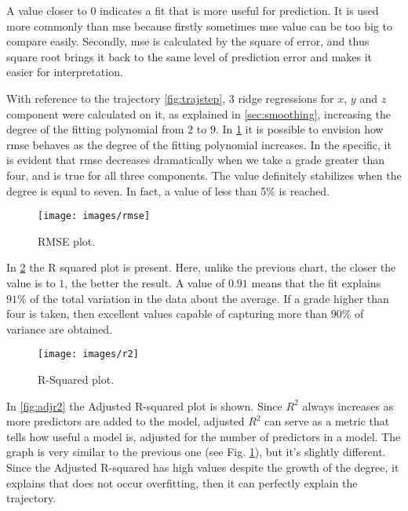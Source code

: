 \begin{itemize}
    A value closer to $0$ indicates a fit that is more useful for prediction. It is used more commonly than \gls{mse} because firstly sometimes \gls{mse} value can be too big to compare easily. Secondly, \gls{mse} is calculated by the square of error, and thus square root brings it back to the same level of prediction error and makes it easier for interpretation.
\end{itemize}

\noindent With reference to the trajectory \ref{fig:trajstep}, $3$ ridge regressions for $x$, $y$ and $z$ component were calculated on it, as explained in \ref{sec:smoothing}, increasing the degree of the fitting polynomial from $2$ to $9$. In \ref{fig:rmse} it is possible to envision how \gls{rmse} behaves as the degree of the fitting polynomial increases. In the specific, it is evident that \gls{rmse} decreases dramatically when we take a grade greater than four, and is true for all three components. The value definitely stabilizes when the degree is equal to seven. In fact, a value of less than 5\% is reached.

\begin{figure}[H]
	\centering
	\texttt{[image: images/rmse]}
	\caption[RMSE.]{RMSE plot.}
	\label{fig:rmse}
\end{figure}

\noindent In \ref{fig:r2} the R squared plot is present. Here, unlike the previous chart, the closer the value is to $1$, the better the result. A value of $0.91$ means that the fit explains $91\%$ of the total variation in the data about the average. If a grade higher than four is taken, then excellent values capable of capturing more than $90\%$ of variance are obtained.

\begin{figure}[H]
	\centering
	\texttt{[image: images/r2]}
	\caption[R-Squared.]{R-Squared plot.}
	\label{fig:r2}
\end{figure}

\noindent In \ref{fig:adjr2} the Adjusted R-squared plot is shown. Since $R^2$ always increases as more predictors are added to the model, adjusted $R^2$ can serve as a metric that tells how useful a model is, adjusted for the number of predictors in a model. The graph is very similar to the previous one (see Fig. \ref{fig:rmse}), but it’s slightly different. Since the Adjusted R-squared has high values despite the growth of the degree, it explains that does not occur overfitting, then it can perfectly explain the trajectory.

